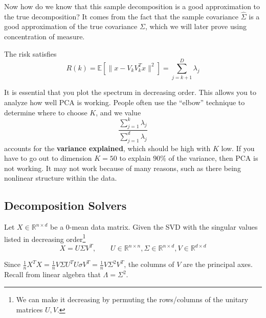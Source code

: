  Now how do we know that this sample decomposition is a good approximation to the true decomposition? It comes from the fact that the sample covariance $\hat{\Sigma}$ is a good approximation of the true covariance $\Sigma$, which we will later prove using concentration of measure. 

  \begin{theorem}[Risk]
    The risk satisfies 
    \begin{equation}
      R(k) = \mathbb{E}[\| x - V_k V_k^T x \|^2 ] = \sum_{j=k+1}^D \lambda_j 
    \end{equation}
  \end{theorem}

  It is essential that you plot the spectrum in decreasing order. This allows you to analyze how well PCA is working. People often use the ``elbow'' technique to determine where to choose $K$, and we value 
  \begin{equation}
    \frac{\sum_{j=1}^k \lambda_j}{\sum_{j=1}^d \lambda_j} 
  \end{equation}
  accounts for the \textbf{variance explained}, which should be high with $K$ low. If you have to go out to dimension $K=50$ to explain $90\%$ of the variance, then PCA is not working. It may not work because of many reasons, such as there being nonlinear structure within the data. 

\subsection{Decomposition Solvers}

  \begin{theorem} 
    Let $X \in \mathbb{R}^{n \times d}$ be a $0$-mean data matrix. Given the SVD with the singular values listed in decreasing order\footnote{We can make it decreasing by permuting the rows/columns of the unitary matrices $U, V$.}
    \begin{equation}
      X = U \Sigma V^T, \qquad U \in \mathbb{R}^{n \times n}, \Sigma \in \mathbb{R}^{n \times d}, V \in \mathbb{R}^{d \times d}
    \end{equation}
  \end{theorem}

  Since $\frac{1}{n} X^T X = \frac{1}{n} V \Sigma U^T U \sigma V^T = \frac{1}{n} V \Sigma^2 V^T$, the columns of $V$ are the principal axes. Recall from linear algebra that $\Lambda = \Sigma^2$. 

